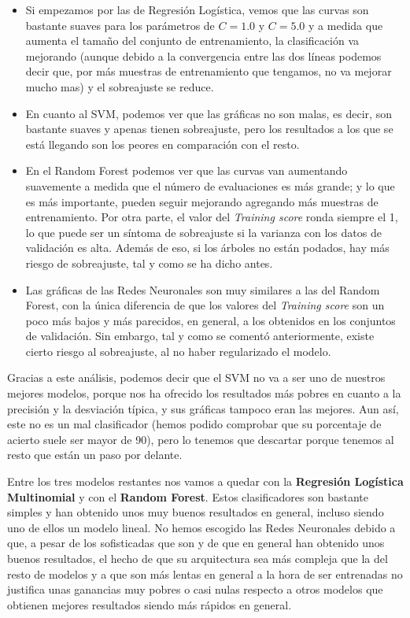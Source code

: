 \documentclass[11pt,a4paper]{article}
\begin{document}
\begin{itemize}[label=\textbullet]
    \item Si empezamos por las de Regresión Logística, vemos que las curvas son bastante suaves para los parámetros de $C = 1.0$ y $C = 5.0$ y a
    medida que aumenta el tamaño del conjunto de entrenamiento, la clasificación va mejorando (aunque debido a la convergencia entre las dos líneas
    podemos decir que, por más muestras de entrenamiento que tengamos, no va mejorar mucho mas) y el sobreajuste se reduce.
    \item En cuanto al SVM, podemos ver que las gráficas no son malas, es decir, son bastante suaves y apenas tienen sobreajuste, pero los
    resultados a los que se está llegando son los peores en comparación con el resto.
    \item En el Random Forest podemos ver que las curvas van aumentando suavemente a medida que el número de evaluaciones es más grande; y lo que es
    más importante, pueden seguir mejorando agregando más muestras de entrenamiento. Por otra parte, el valor del \textit{Training score} ronda
    siempre el 1, lo que puede ser un síntoma de sobreajuste si la varianza con los datos de validación es alta. Además de eso, si los árboles
    no están podados, hay más riesgo de sobreajuste, tal y como se ha dicho antes.
    \item Las gráficas de las Redes Neuronales son muy similares a las del Random Forest, con la única diferencia de que los valores del
    \textit{Training score} son un poco más bajos y más parecidos, en general, a los obtenidos en los conjuntos de validación. Sin embargo,
    tal y como se comentó anteriormente, existe cierto riesgo al sobreajuste, al no haber regularizado el modelo.
\end{itemize}

Gracias a este análisis, podemos decir que el SVM no va a ser uno de nuestros mejores modelos, porque nos ha ofrecido los resultados más
pobres en cuanto a la precisión y la desviación típica, y sus gráficas tampoco eran las mejores. Aun así, este no es un mal clasificador
(hemos podido comprobar que su porcentaje de acierto suele ser mayor de 90), pero lo tenemos que descartar porque tenemos al resto que
están un paso por delante.

Entre los tres modelos restantes nos vamos a quedar con la \textbf{Regresión Logística Multinomial} y con el \textbf{Random Forest}. Estos
clasificadores son bastante simples y han obtenido unos muy buenos resultados en general, incluso siendo uno de ellos un modelo lineal. No hemos
escogido las Redes Neuronales debido a que, a pesar de los sofisticadas que son y de que en general han obtenido unos buenos resultados,
el hecho de que su arquitectura sea más compleja que la del resto de modelos y a que son más lentas en general a la hora de ser entrenadas no
justifica unas ganancias muy pobres o casi nulas respecto a otros modelos que obtienen mejores resultados siendo más rápidos en general.
\end{document}
